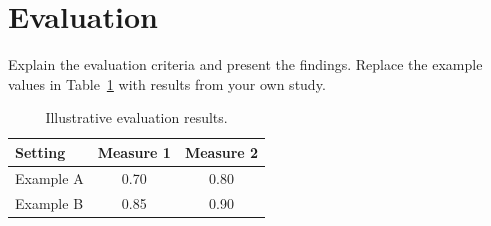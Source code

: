 \section{Evaluation}
Explain the evaluation criteria and present the findings. Replace the example
values in Table~\ref{tab:example} with results from your own study.
\begin{table}[ht]
\centering
\caption{Illustrative evaluation results.}
\label{tab:example}
\begin{tabular}{lcc}
\toprule
Setting & Measure 1 & Measure 2 \\
\midrule
Example A & 0.70 & 0.80 \\
Example B & 0.85 & 0.90 \\
\bottomrule
\end{tabular}
\end{table}
